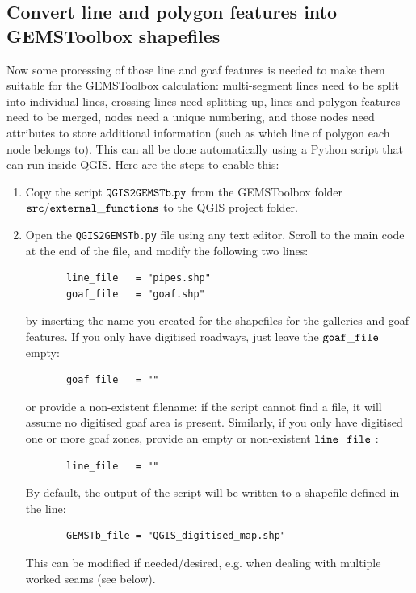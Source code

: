 \subsection{Convert line and polygon features into GEMSToolbox shapefiles}
\label{sec:QGIS2GEMS}
Now some processing of those line and goaf features is needed to make them suitable for the GEMSToolbox calculation: multi-segment lines need to be split into individual lines, crossing lines need splitting up, lines and polygon features need to be merged, nodes need a unique numbering, and those nodes need attributes to store additional information (such as which line of polygon each node belongs to). This can all be done automatically using a Python script that can run inside QGIS. Here are the steps to enable this: 
\begin{enumerate}
    \item Copy the script ${\tt QGIS2GEMSTb.py}$ from the GEMSToolbox folder ${\tt src/external\_functions}$ to the QGIS project folder.
    \item Open the {\tt QGIS2GEMSTb.py} file using any text editor. Scroll to the main code at the end of the file, and modify the following two lines: 
    \begin{verbatim}
       line_file   = "pipes.shp"
       goaf_file   = "goaf.shp"
    \end{verbatim}
    by inserting the name you created for the shapefiles for the galleries and goaf features. 
    If you only have digitised roadways, just leave the ${\tt goaf\_file}$ empty:
    \begin{verbatim}
       goaf_file   = ""
    \end{verbatim}
    or provide a non-existent filename: if the script cannot find a file, it will assume no digitised goaf area is present. Similarly, if you only have digitised one or more goaf zones, provide an empty or non-existent ${\tt line\_file}$ :
    \begin{verbatim}
       line_file   = ""
    \end{verbatim}
    By default, the output of the script will be written to a shapefile defined in the line: 
    \begin{verbatim}
       GEMSTb_file = "QGIS_digitised_map.shp"
    \end{verbatim}
    This can be modified if needed/desired, e.g. when dealing with multiple worked seams (see below).
    

\end{enumerate}
